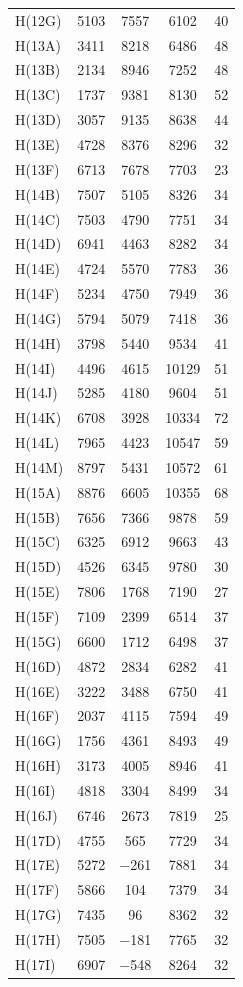 \begin{center}
{\begin{supertabular}{lcccc}
H(12G)&5103&7557&6102&40\\
H(13A)&3411&8218&6486&48\\
H(13B)&2134&8946&7252&48\\
H(13C)&1737&9381&8130&52\\
H(13D)&3057&9135&8638&44\\
H(13E)&4728&8376&8296&32\\
H(13F)&6713&7678&7703&23\\
H(14B)&7507&5105&8326&34\\
H(14C)&7503&4790&7751&34\\
H(14D)&6941&4463&8282&34\\
H(14E)&4724&5570&7783&36\\
H(14F)&5234&4750&7949&36\\
H(14G)&5794&5079&7418&36\\
H(14H)&3798&5440&9534&41\\
H(14I)&4496&4615&10129&51\\
H(14J)&5285&4180&9604&51\\
H(14K)&6708&3928&10334&72\\
H(14L)&7965&4423&10547&59\\
H(14M)&8797&5431&10572&61\\
H(15A)&8876&6605&10355&68\\
H(15B)&7656&7366&9878&59\\
H(15C)&6325&6912&9663&43\\
H(15D)&4526&6345&9780&30\\
H(15E)&7806&1768&7190&27\\
H(15F)&7109&2399&6514&37\\
H(15G)&6600&1712&6498&37\\
H(16D)&4872&2834&6282&41\\
H(16E)&3222&3488&6750&41\\
H(16F)&2037&4115&7594&49\\
H(16G)&1756&4361&8493&49\\
H(16H)&3173&4005&8946&41\\
H(16I)&4818&3304&8499&34\\
H(16J)&6746&2673&7819&25\\
H(17D)&4755&565&7729&34\\
H(17E)&5272&$-$261&7881&34\\
H(17F)&5866&104&7379&34\\
H(17G)&7435&96&8362&32\\
H(17H)&7505&$-$181&7765&32\\
H(17I)&6907&$-$548&8264&32\\

\end{supertabular}}
\end{center}
